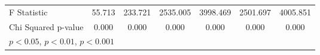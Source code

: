 \begin{table}[htbp]
\begin{tabular}{l*{6}{c}}
F Statistic         &      55.713         &     233.721         &    2535.005         &    3998.469         &    2501.697         &    4005.851         \\
Chi Squared p-value &       0.000         &       0.000         &       0.000         &       0.000         &       0.000         &       0.000         \\
\hline\hline
\multicolumn{7}{l}{\footnotesize \sym{*} \(p<0.05\), \sym{**} \(p<0.01\), \sym{***} \(p<0.001\)}\\
\end{tabular}
\end{table}
